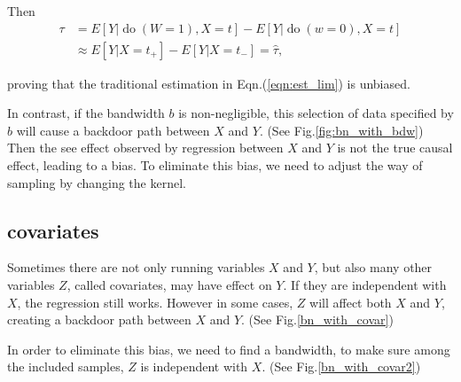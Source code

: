 \documentclass[a4 paper,12pt]{article}
\DeclareMathOperator{\Do}{do}
\begin{document}
Then
\begin{align}
   \tau&=E[Y|\Do(W=1),X=t]-E[Y|\Do(w=0),X=t]\\
   &\approx E[Y|X=t_+]-E[Y|X=t_-]=\hat\tau,
\end{align}

\noindent proving that the traditional estimation in Eqn.(\ref{eqn:est_lim}) is unbiased.

In contrast, if the bandwidth $b$ is non-negligible, this selection of data specified by $b$ will cause a backdoor path between $X$ and $Y$. (See Fig.\ref{fig:bn_with_bdw}) Then the see effect observed by regression between $X$ and $Y$ is not the true causal effect, leading to a bias. To eliminate this bias, we need to adjust the way of sampling by changing the kernel.

\subsection*{covariates}
Sometimes there are not only running variables $X$ and $Y$, but also many other variables $Z$, called covariates, may have effect on $Y$. If they are independent with $X$, the regression still works. However in some cases, $Z$ will affect both $X$ and $Y$, creating a backdoor path between $X$ and $Y$. (See Fig.\ref{bn_with_covar})

In order to eliminate this bias, we need to find a bandwidth, to make sure among the included samples, $Z$ is independent with $X$. (See Fig.\ref{bn_with_covar2})
\end{document}
